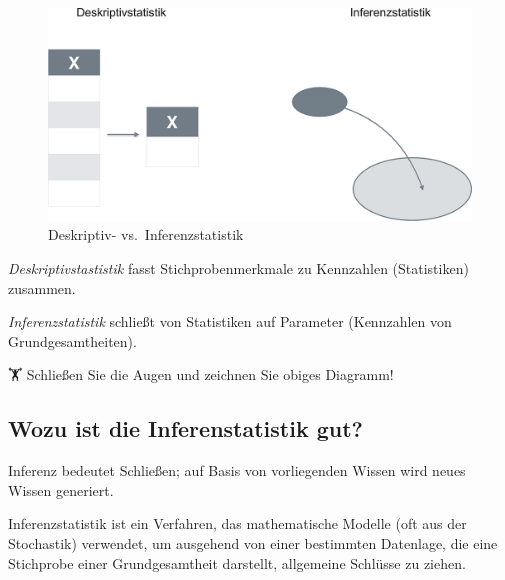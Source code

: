 \documentclass[
  a4paper,
  DIV=11]{scrreprt}
\theoremstyle{definition}
\theoremstyle{remark}
\begin{document}
\begin{figure}

{\centering \includegraphics{./img/desk_vs_inf-crop.png}

}

\caption{\label{fig-inf1}Deskriptiv- vs.~Inferenzstatistik}

\end{figure}

\emph{Deskriptivstastistik} fasst Stichprobenmerkmale zu Kennzahlen
(Statistiken) zusammen.

\emph{Inferenzstatistik} schließt von Statistiken auf Parameter
(Kennzahlen von Grundgesamtheiten).

🏋 Schließen Sie die Augen und zeichnen Sie obiges Diagramm!

\hypertarget{wozu-ist-die-inferenstatistik-gut}{%
\subsection{Wozu ist die Inferenstatistik
gut?}\label{wozu-ist-die-inferenstatistik-gut}}

\begin{tcolorbox}[enhanced jigsaw, colframe=quarto-callout-note-color-frame, title=\textcolor{quarto-callout-note-color}{\faInfo}\hspace{0.5em}{Hinweis}, breakable, leftrule=.75mm, coltitle=black, toptitle=1mm, bottomrule=.15mm, bottomtitle=1mm, opacityback=0, arc=.35mm, rightrule=.15mm, left=2mm, colbacktitle=quarto-callout-note-color!10!white, opacitybacktitle=0.6, toprule=.15mm, titlerule=0mm, colback=white]
Inferenz bedeutet Schließen; auf Basis von vorliegenden Wissen wird
neues Wissen generiert.
\end{tcolorbox}

Inferenzstatistik ist ein Verfahren, das mathematische Modelle (oft aus
der Stochastik) verwendet, um ausgehend von einer bestimmten Datenlage,
die eine Stichprobe einer Grundgesamtheit darstellt, allgemeine Schlüsse
zu ziehen.
\end{document}
